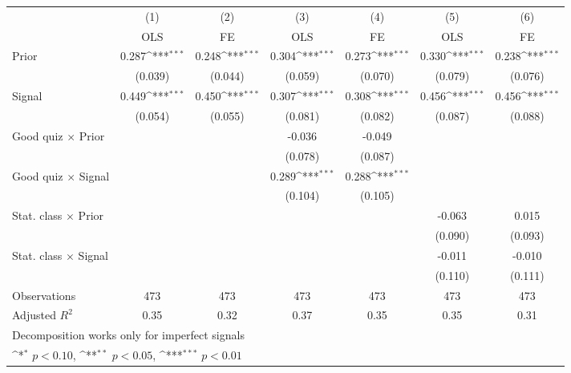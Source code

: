 {
\def\sym#1{\ifmmode^{#1}\else\(^{#1}\)\fi}
\begin{tabular}{l*{6}{c}}
\hline\hline
                &\multicolumn{1}{c}{(1)}&\multicolumn{1}{c}{(2)}&\multicolumn{1}{c}{(3)}&\multicolumn{1}{c}{(4)}&\multicolumn{1}{c}{(5)}&\multicolumn{1}{c}{(6)}\\
                &\multicolumn{1}{c}{OLS}&\multicolumn{1}{c}{FE}&\multicolumn{1}{c}{OLS}&\multicolumn{1}{c}{FE}&\multicolumn{1}{c}{OLS}&\multicolumn{1}{c}{FE}\\
\hline
Prior           &    0.287\sym{***}&    0.248\sym{***}&    0.304\sym{***}&    0.273\sym{***}&    0.330\sym{***}&    0.238\sym{***}\\
                &  (0.039)         &  (0.044)         &  (0.059)         &  (0.070)         &  (0.079)         &  (0.076)         \\
Signal          &    0.449\sym{***}&    0.450\sym{***}&    0.307\sym{***}&    0.308\sym{***}&    0.456\sym{***}&    0.456\sym{***}\\
                &  (0.054)         &  (0.055)         &  (0.081)         &  (0.082)         &  (0.087)         &  (0.088)         \\
Good quiz $\times$ Prior&                  &                  &   -0.036         &   -0.049         &                  &                  \\
                &                  &                  &  (0.078)         &  (0.087)         &                  &                  \\
Good quiz $\times$ Signal&                  &                  &    0.289\sym{***}&    0.288\sym{***}&                  &                  \\
                &                  &                  &  (0.104)         &  (0.105)         &                  &                  \\
Stat. class $\times$ Prior&                  &                  &                  &                  &   -0.063         &    0.015         \\
                &                  &                  &                  &                  &  (0.090)         &  (0.093)         \\
Stat. class $\times$ Signal&                  &                  &                  &                  &   -0.011         &   -0.010         \\
                &                  &                  &                  &                  &  (0.110)         &  (0.111)         \\
\hline
Observations    &      473         &      473         &      473         &      473         &      473         &      473         \\
Adjusted \(R^{2}\)&     0.35         &     0.32         &     0.37         &     0.35         &     0.35         &     0.31         \\
\hline\hline
\multicolumn{7}{l}{\footnotesize Decomposition works only for imperfect signals}\\
\multicolumn{7}{l}{\footnotesize \sym{*} \(p<0.10\), \sym{**} \(p<0.05\), \sym{***} \(p<0.01\)}\\
\end{tabular}
}
